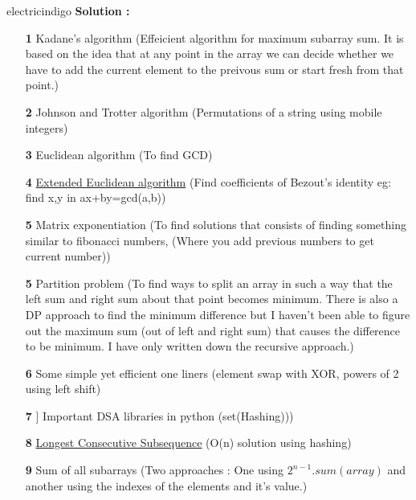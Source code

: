 \documentclass[12pt]{article}
\begin{document}
\begin{mybox}{electricindigo}{}
	\textbf{Solution :} 
	\begin{itemize}
		\item[\textbf{1}] Kadane's algorithm (Effeicient algorithm for maximum subarray sum. It is based on the idea that at any point in the array we can decide whether we have to add the current element to the preivous sum or start fresh from that point.)
		\item[\textbf{2}] Johnson and Trotter algorithm (Permutations of a string using mobile integers) 
		\item[\textbf{3}] Euclidean algorithm (To find GCD) 
		\item[\textbf{4}] \href{https://en.wikipedia.org/wiki/Extended_Euclidean_algorithm}{Extended Euclidean algorithm} (Find coefficients of Bezout's identity eg: find x,y in ax+by=gcd(a,b))
		\item[\textbf{5}] Matrix exponentiation (To find solutions that consists of finding something similar to fibonacci numbers, (Where you add previous numbers to get current number))
		\item[\textbf{5}] Partition problem (To find ways to split an array in such a way that the left sum and right sum about that point becomes minimum. There is also a DP approach to find the minimum difference but I haven't been able to figure out the maximum sum (out of left and right sum) that causes the difference to be minimum. I have only written down the recursive approach.)
		\item[\textbf{6}] Some simple yet efficient one liners (element swap with XOR, powers of 2 using left shift)
		\item[\textbf{7}]] Important DSA libraries in python (set(Hashing)))
		\item[\textbf{8}] \href{https://www.geeksforgeeks.org/longest-consecutive-subsequence/}{Longest Consecutive Subsequence} (O(n) solution using hashing)
		\item[\textbf{9}] Sum of all subarrays (Two approaches : One using $2^{n-1}.sum(array)$ and another using the indexes of the elements and it's value.)
		
	\end{itemize}
	

\end{mybox}


	

		
		
\end{document}
